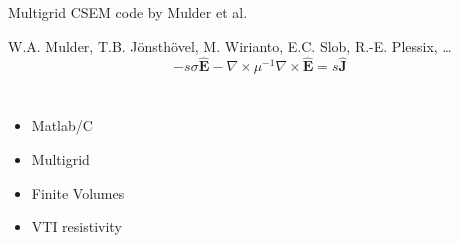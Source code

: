 \documentclass[xcolor=svgnames, aspectratio=169]{beamer}
\begin{document}
  \begin{frame}%
    {Multigrid CSEM code by Mulder et al.}
    \vfill
    \begin{block}{W.A. Mulder, T.B. Jönsthövel, M. Wirianto, E.C. Slob, R.-E.
      Plessix, \ldots}
      \begin{equation}
        -s \sigma \mathbf{\hat{E}} - \nabla \times \mu^{-1} \nabla
        \times \mathbf{\hat{E}} = s\mathbf{\hat{J}}
            \nonumber
      \end{equation}
    \end{block}
    \vfill
    \begin{columns}
        \begin{itemize}
          \item Matlab/C
          \item Multigrid
          \item Finite Volumes
          \item VTI resistivity
        \end{itemize}
      \end{columns}
  \end{frame}
\end{document}
